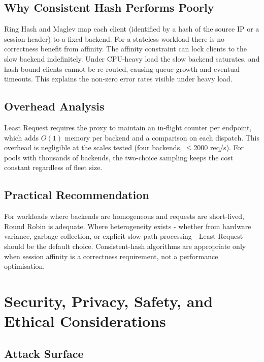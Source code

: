 \documentclass[conference]{IEEEtran}
\begin{document}
\subsection{Why Consistent Hash Performs Poorly}

Ring Hash and Maglev map each client (identified by a hash of the source IP or
a session header) to a fixed backend.
For a stateless workload there is no correctness benefit from affinity.
The affinity constraint can lock clients to the slow backend indefinitely.
Under CPU-heavy load the slow backend saturates, and hash-bound clients cannot
be re-routed, causing queue growth and eventual timeouts.
This explains the non-zero error rates visible under heavy load.

\subsection{Overhead Analysis}

Least Request requires the proxy to maintain an in-flight counter per
endpoint, which adds $O(1)$ memory per backend and a comparison on each
dispatch.
This overhead is negligible at the scales tested (four backends, $\le$2000
req/s).
For pools with thousands of backends, the two-choice sampling keeps the cost
constant regardless of fleet size.

\subsection{Practical Recommendation}

For workloads where backends are homogeneous and requests are short-lived,
Round Robin is adequate.
Where heterogeneity exists - whether from hardware variance, garbage collection,
or explicit slow-path processing - Least Request should be the default choice.
Consistent-hash algorithms are appropriate only when session affinity is a
correctness requirement, not a performance optimisation.

\section{Security, Privacy, Safety, and Ethical Considerations}
\label{sec:security}

\subsection{Attack Surface}
\end{document}
